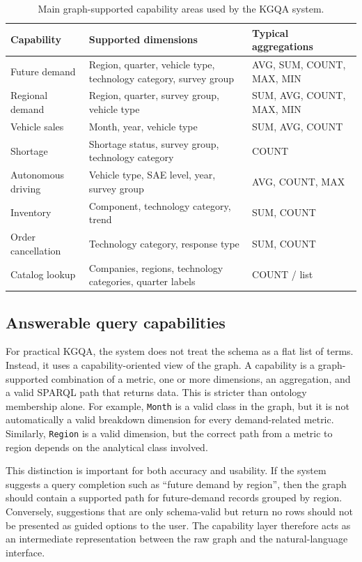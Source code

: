 \begin{table}[ht]
\centering
\caption{Main graph-supported capability areas used by the KGQA system.}
\label{tab:domain-capabilities}
\begin{tabular}{p{3.2cm}p{7.8cm}p{3.2cm}}
\hline
\textbf{Capability} & \textbf{Supported dimensions} & \textbf{Typical aggregations} \\
\hline
Future demand & Region, quarter, vehicle type, technology category, survey group & AVG, SUM, COUNT, MAX, MIN \\
Regional demand & Region, quarter, survey group, vehicle type & SUM, AVG, COUNT, MAX, MIN \\
Vehicle sales & Month, year, vehicle type & SUM, AVG, COUNT \\
Shortage & Shortage status, survey group, technology category & COUNT \\
Autonomous driving & Vehicle type, SAE level, year, survey group & AVG, COUNT, MAX \\
Inventory & Component, technology category, trend & SUM, COUNT \\
Order cancellation & Technology category, response type & SUM, COUNT \\
Catalog lookup & Companies, regions, technology categories, quarter labels & COUNT / list \\
\hline
\end{tabular}
\end{table}

\subsection{Answerable query capabilities}
\label{subsec:answerable-query-capabilities}

For practical KGQA, the system does not treat the schema as a flat list of terms. Instead, it uses a capability-oriented view of the graph. A capability is a graph-supported combination of a metric, one or more dimensions, an aggregation, and a valid SPARQL path that returns data. This is stricter than ontology membership alone. For example, \texttt{Month} is a valid class in the graph, but it is not automatically a valid breakdown dimension for every demand-related metric. Similarly, \texttt{Region} is a valid dimension, but the correct path from a metric to region depends on the analytical class involved.

This distinction is important for both accuracy and usability. If the system suggests a query completion such as ``future demand by region'', then the graph should contain a supported path for future-demand records grouped by region. Conversely, suggestions that are only schema-valid but return no rows should not be presented as guided options to the user. The capability layer therefore acts as an intermediate representation between the raw graph and the natural-language interface.

